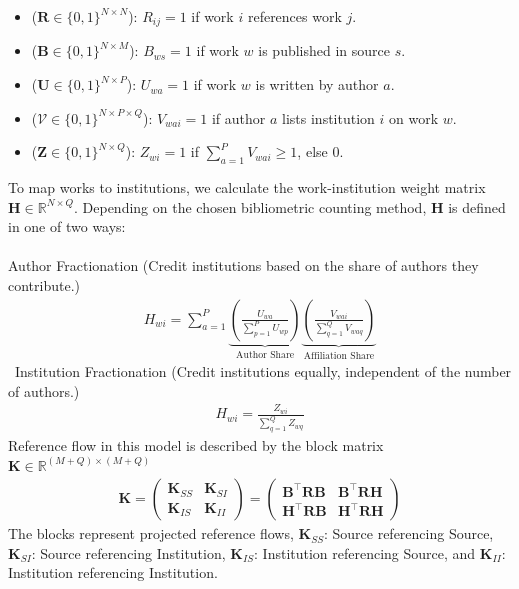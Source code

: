 \documentclass[10pt]{article}
\begin{document}
\begin{itemize}
	\item[]  ($\mathbf{R} \in \{0,1\}^{N \times N}$):
	$R_{ij} = 1$ if work $i$ references work $j$.
	
	\item[]  ($\mathbf{B} \in \{0,1\}^{N \times M}$):
	$B_{ws} = 1$ if work $w$ is published in source $s$.
	
	\item[]  ($\mathbf{U} \in \{0,1\}^{N \times P}$):
	$U_{wa} = 1$ if work $w$ is written by author $a$.
	
	\item[]  ($\mathcal{V} \in \{0,1\}^{N \times P \times Q}$): 
	$V_{wai} = 1$ if author $a$ lists institution $i$ on work $w$.
	
	\item[]  ($\mathbf{Z} \in \{0,1\}^{N \times Q}$):
	$Z_{wi} = 1$ if $\sum_{a=1}^{P} V_{wai} \geq 1$, else $0$.
\end{itemize}
To map works to institutions, we calculate the work-institution weight matrix $\mathbf{H} \in \mathbb{R}^{N \times Q}$. Depending on the chosen bibliometric counting method, $\mathbf{H}$ is defined in one of two ways: \\
\\
Author Fractionation (Credit institutions based on the share of authors they contribute.)
\begin{align}
	H_{wi} = \sum_{a=1}^{P} \underbrace{\left( \frac{U_{wa}}{\sum_{p=1}^{P} U_{wp}} \right)}_{\text{Author Share}} \underbrace{\left( \frac{V_{wai}}{\sum_{q=1}^{Q} V_{waq}} \right)}_{\text{Affiliation Share}}
\end{align}\
Institution Fractionation (Credit institutions equally, independent of the number of authors.)
\begin{align}
	H_{wi} = \frac{Z_{wi}}{\sum_{q=1}^{Q} Z_{wq}}
\end{align}
Reference flow in this model is described by the block matrix $\mathbf{K} \in \mathbb{R}^{(M+Q) \times (M+Q)}$
\begin{align}
	\mathbf{K} = 
	\begin{pmatrix}
		\mathbf{K}_{SS} & \mathbf{K}_{SI} \\
		\mathbf{K}_{IS} & \mathbf{K}_{II} 
	\end{pmatrix} = 
	\begin{pmatrix}
		\mathbf{B}^\top \mathbf{R} \mathbf{B} & \mathbf{B}^\top \mathbf{R} \mathbf{H} \\
		\mathbf{H}^\top \mathbf{R} \mathbf{B} & \mathbf{H}^\top \mathbf{R} \mathbf{H} 
	\end{pmatrix}
\end{align}
The blocks represent projected reference flows, $\mathbf{K}_{SS}$: Source referencing Source, $\mathbf{K}_{SI}$: Source referencing Institution, $\mathbf{K}_{IS}$: Institution referencing Source, and $\mathbf{K}_{II}$: Institution referencing Institution. 
\end{document}
